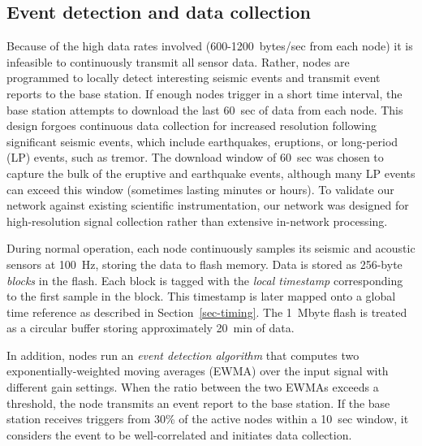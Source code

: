 \subsection{Event detection and data collection}

Because of the high data rates involved (600-1200~bytes/sec 
from each node) it is infeasible to continuously transmit 
all sensor data. Rather,
nodes are programmed to locally detect interesting seismic events
and transmit event reports to the base station. If enough nodes
trigger in a short time interval, the base station attempts to
download the last 60~sec of data from each node. 
This design forgoes continuous
data collection for increased resolution following significant seismic
events, which include earthquakes, eruptions, or long-period (LP)
events, such as tremor.
The download window of 60~sec was chosen to capture the bulk
of the eruptive and earthquake events, although many LP events
can exceed this window (sometimes lasting minutes or hours).
To validate our network against existing scientific instrumentation,
our network was designed for high-resolution signal collection
rather than extensive in-network processing.

During normal operation, each node continuously samples its seismic 
and acoustic sensors at 100~Hz, storing the data to flash
memory. Data is stored as 256-byte {\em blocks} in the flash.
Each block 
is tagged with the {\em local timestamp} corresponding 
to the first sample in the block. 
This timestamp is later mapped onto a global time reference
as described in Section~\ref{sec-timing}. The 1~Mbyte flash is treated 
as a circular buffer storing approximately 20~min of data. 

In addition, nodes run an {\em event detection algorithm} that
computes two exponentially-weighted moving averages (EWMA) 
over the input signal with different gain
settings. When the ratio between the two EWMAs exceeds a threshold,
the node transmits an event report to the base station.
If the base station receives triggers from 30\% of the active nodes
within a 10~sec window, it considers the event to be well-correlated 
and initiates data collection.

